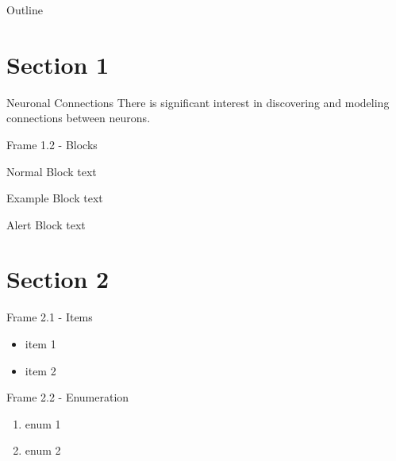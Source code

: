 \documentclass[xcolor=svgnames]{beamer}
\title[\shorttitle]{\maintitle}
\subtitle{\sbtitle}
\author[\sauthors]{\lauthors\\ \scriptsize{\em \home}}
\institute{\venue\\ \tiny{\location}}
\date[\sdate]{\scriptsize{\ldate}}
\begin{document}
\begin{frame}[plain]
	\titlepage
\end{frame}

\begin{frame}[plain]{Outline}
	\tableofcontents
\end{frame}

\section{Section 1}
\begin{frame}{Neuronal Connections}
	There is significant interest in discovering and modeling connections between neurons. 
\end{frame}

\begin{frame}{Frame 1.2 - Blocks}
	\begin{block}{Normal Block}
		text
	\end{block}
	
	\begin{exampleblock}{Example Block}
		text
	\end{exampleblock}
	
	\begin{alertblock}{Alert Block}
		text
	\end{alertblock}
\end{frame}

\section{Section 2}
\begin{frame}{Frame 2.1 - Items}
	\begin{itemize}
	\item item 1
	\item item 2
	\end{itemize}
\end{frame}

\begin{frame}{Frame 2.2 - Enumeration}
	\begin{enumerate}
	\item enum 1
	\item enum 2
	\end{enumerate}
\end{frame}
\end{document}
